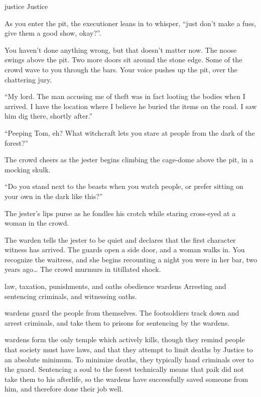 \begin{multicols}{2}
  {\gls{justice}}%
  {Justice}%
  {
    As you enter the pit, the executioner leans in to whisper, ``just don't make a fuss, give them a good show, okay?''.

    You haven't done anything wrong, but that doesn't matter now.
    The noose swings above the pit.
    Two more doors sit around the stone edge.
    Some of the crowd wave to you through the bars.
    Your voice pushes up the pit, over the chattering jury.

    ``My lord.
    The man accusing me of theft was in fact looting the bodies when I arrived.
    I have the location where I believe he buried the items on the road.
    I saw him dig there, shortly after.''

    {\sffamily ``Peeping Tom, eh?
    What witchcraft lets you stare at people from the dark of the forest?''}

    The crowd cheers as the jester begins climbing the cage-dome above the pit, in a mocking skulk.

    {\sffamily ``Do you stand next to the beasts when you watch people, or prefer sitting on your own in the dark like this?''}

    The jester's lips purse as he fondles his crotch while staring cross-eyed at a woman in the crowd.

    The \gls{warden} tells the jester to be quiet and declares that the first character witness has arrived.
    The guards open a side door, and a woman walks in.
    You recognize the waitress, and she begins recounting a night you were in her bar, two years ago\ldots
    The crowd murmurs in titillated shock.
  }%
  {law, taxation, punishments, and oaths}%
  {obedience}%
  {\Glspl{warden}}%
  {
    Arresting and sentencing criminals, and witnessing oaths.
  }%

\Glspl{warden} guard the people from themselves.
The footsoldiers track down and arrest criminals, and take them to prisons for sentencing by the \glspl{warden}.

\Glspl{warden} form the only temple which actively kills, though they remind people that society must have laws, and that they attempt to limit deaths by Justice to an absolute minimum.
To minimize deaths, they typically hand criminals over to the \gls{guard}.
Sentencing a soul to the forest technically means that \gls{paik} did not take them to his afterlife, so the \glspl{warden} have successfully saved someone from him, and therefore done their job well.


\end{multicols}
